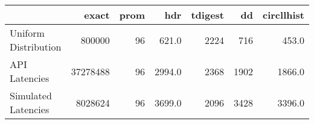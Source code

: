 \begin{tabular}{lrrrrrr}
\toprule
{} &     exact &  prom &     hdr &  tdigest &    dd &  circllhist \\
\midrule
Uniform Distribution &    800000 &    96 &   621.0 &     2224 &   716 &       453.0 \\
API Latencies        &  37278488 &    96 &  2994.0 &     2368 &  1902 &      1866.0 \\
Simulated Latencies  &   8028624 &    96 &  3699.0 &     2096 &  3428 &      3396.0 \\
\bottomrule
\end{tabular}
